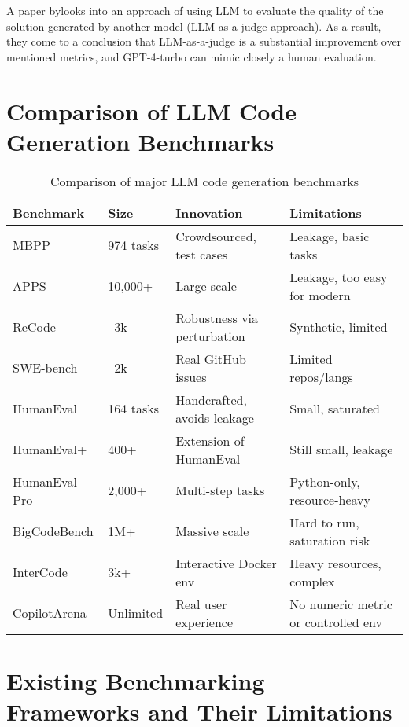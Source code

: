 A paper by\cite{crupi2025effectiveness}looks into an approach of using LLM to evaluate the quality of the solution generated by another model (LLM-as-a-judge approach).
As a result, they come to a conclusion that LLM-as-a-judge is a substantial improvement over mentioned metrics, and GPT-4-turbo can mimic closely a human evaluation.

\section{Comparison of LLM Code Generation Benchmarks}

\begin{table}[h!]
    \centering
    \begin{tabular}{|l|l|p{5.3cm}|p{5.3cm}|}
        \hline
        \textbf{Benchmark} & \textbf{Size} & \textbf{Innovation} & \textbf{Limitations} \\
        \hline
        MBPP & 974 tasks & Crowdsourced, test cases & Leakage, basic tasks \\
        \hline
        APPS & 10,000+ & Large scale & Leakage, too easy for modern \\
        \hline
        ReCode & ~3k & Robustness via perturbation & Synthetic, limited \\
        \hline
        SWE-bench & ~2k & Real GitHub issues & Limited repos/langs \\
        \hline
        HumanEval & 164 tasks & Handcrafted, avoids leakage & Small, saturated \\
        \hline
        HumanEval+ & 400+ & Extension of HumanEval & Still small, leakage \\
        \hline
        HumanEval Pro & 2,000+ & Multi-step tasks & Python-only, resource-heavy \\
        \hline
        BigCodeBench & 1M+ & Massive scale & Hard to run, saturation risk \\
        \hline
        InterCode & 3k+  & Interactive Docker env & Heavy resources, complex \\
        \hline
        CopilotArena & Unlimited & Real user experience & No numeric metric or controlled env \\
        \hline
    \end{tabular}
    \caption{Comparison of major LLM code generation benchmarks}\label{tab:bench-compare-table}
\end{table}



\section{Existing Benchmarking Frameworks and Their Limitations}

